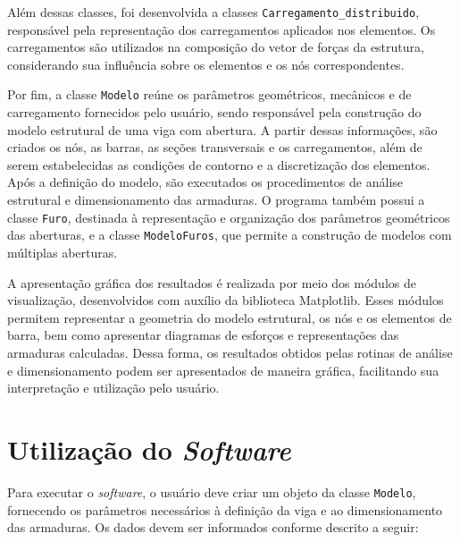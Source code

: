 Além dessas classes, foi desenvolvida a classes \texttt{Carregamento\_distribuido}, responsável pela representação dos carregamentos aplicados nos elementos. Os carregamentos são utilizados na composição do vetor de forças da estrutura, considerando sua influência sobre os elementos e os nós correspondentes.

Por fim, a classe \texttt{Modelo} reúne os parâmetros geométricos, mecânicos e de carregamento fornecidos pelo usuário, sendo responsável pela construção do modelo estrutural de uma viga com abertura. A partir dessas informações, são criados os nós, as barras, as seções transversais e os carregamentos, além de serem estabelecidas as condições de contorno e a discretização dos elementos. Após a definição do modelo, são executados os procedimentos de análise estrutural e dimensionamento das armaduras. O programa também possui a classe \texttt{Furo}, destinada à representação e organização dos parâmetros geométricos das aberturas, e a classe \texttt{ModeloFuros}, que permite a construção de modelos com múltiplas aberturas.

A apresentação gráfica dos resultados é realizada por meio dos módulos de visualização, desenvolvidos com auxílio da biblioteca Matplotlib. Esses módulos permitem representar a geometria do modelo estrutural, os nós e os elementos de barra, bem como apresentar diagramas de esforços e representações das armaduras calculadas. Dessa forma, os resultados obtidos pelas rotinas de análise e dimensionamento podem ser apresentados de maneira gráfica, facilitando sua interpretação e utilização pelo usuário.

\section{Utilização do \textit{Software}}

Para executar o \textit{software}, o usuário deve criar um objeto da classe \texttt{Modelo}, fornecendo os parâmetros necessários à definição da viga e ao dimensionamento das armaduras. Os dados devem ser informados conforme descrito a seguir:

